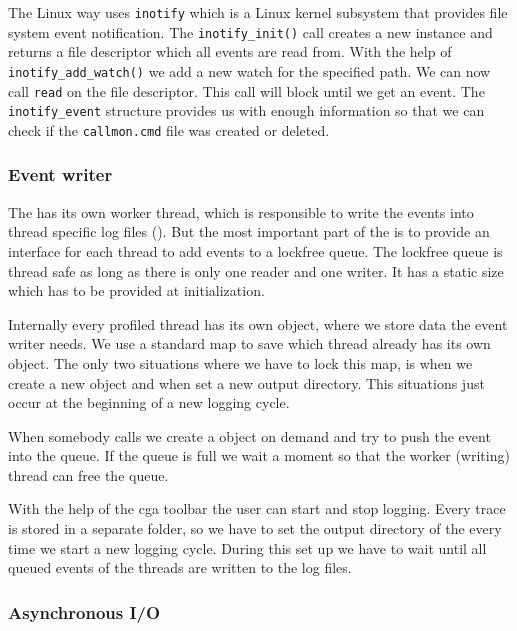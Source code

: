 The Linux way uses \verb=inotify= which is a Linux kernel subsystem that provides file system event notification. The \verb=inotify_init()= call creates a new instance and returns a file descriptor which all events are read from. With the help of \verb=inotify_add_watch()= we add a new watch for the specified path. We can now call \verb=read= on the file descriptor. This call will block until we get an event. The \verb=inotify_event= structure provides us with enough information so that we can check if the \verb=callmon.cmd= file was created or deleted.

\subsubsection{Event writer} 

The  has its own worker thread, which is responsible to write the events into thread specific log files (). But the most important part of the  is to provide an interface for each thread to add events to a lockfree queue. The lockfree queue is thread safe as long as there is only one reader and one writer. It has a static size which has to be provided at initialization.

Internally every profiled thread has its own  object, where we store data the event writer needs. We use a standard map to save which thread already has its own  object. The only two situations where we have to lock this map, is when we create a new  object and when set a new output directory. This situations just occur at the beginning of a new logging cycle.

When somebody calls  we create a  object on demand and try to push the event into the queue. If the queue is full we wait a moment so that the worker (writing) thread can free the queue.

With the help of the cga toolbar the user can start and stop logging. Every trace is stored in a separate folder, so we have to set the output directory of the  every time we start a new logging cycle. During this set up we have to wait until all queued events of the threads are written to the log files.

\subsubsection{Asynchronous I/O}

